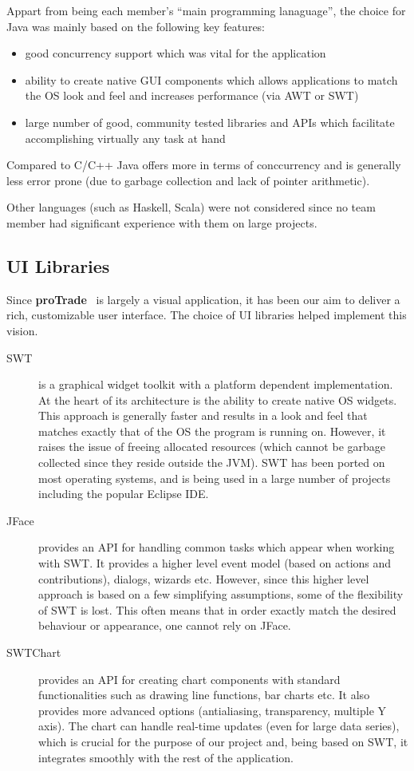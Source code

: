 \documentclass[10pt]{report}
\newcommand{\nm}{{\bf proTrade}}
\newcommand{\nmsp}{{\nm \ }}
\begin{document}
Appart from being each member's ``main programming lanaguage'', the choice for Java was mainly based on the following key features:
\begin{itemize}
  \item good concurrency support which was vital for the application 
  \item ability to create native GUI components which allows applications to match the OS look and feel and increases performance (via AWT or SWT)
  \item large number of good, community tested libraries and APIs which facilitate accomplishing virtually any task at hand
\end{itemize}

Compared to C/C++ Java offers more in terms of conccurrency and is generally less error prone (due to garbage collection and lack of pointer arithmetic).

Other languages (such as Haskell, Scala) were not considered since no team member had significant experience with them on large projects.

\subsection{UI Libraries} 

Since {\nmsp} is largely a visual application, it has been our aim to deliver a rich, customizable user interface. The choice of UI libraries helped implement this vision.

\begin{description}

\item[SWT] is a graphical widget toolkit with a platform dependent implementation. At the heart of its architecture is the ability to create native OS widgets. This approach is generally faster and results in a look and feel that matches exactly that of the OS the program is running on. However, it raises the issue of freeing allocated resources (which cannot be garbage collected since they reside outside the JVM). SWT has been ported on most operating systems, and is being used in a large number of projects including the popular Eclipse IDE.

\item[JFace] provides an API for handling common tasks which appear when working with SWT. It provides a higher level event model (based on actions and contributions), dialogs, wizards etc. However, since this higher level approach is based on a few simplifying assumptions, some of the flexibility of SWT is lost. This often means that in order exactly match the desired behaviour or appearance, one cannot rely on JFace.

\item[SWTChart] provides an API for creating chart components with standard functionalities such as drawing line functions, bar charts etc. It also provides more advanced options (antialiasing, transparency, multiple Y axis). The chart can handle real-time updates (even for large data series), which is crucial for the purpose of our project and, being based on SWT, it integrates smoothly with the rest of the application. 

\end{description}
\end{document}
